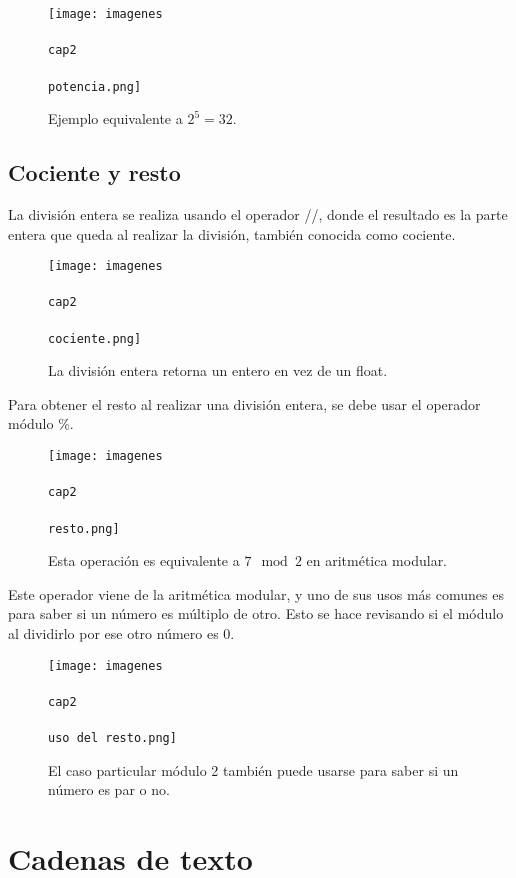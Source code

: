 \documentclass{article}
\begin{document}
      \begin{figure}[ht!]
        \texttt{[image: imagenes\\\\cap2\\\\potencia.png]}
        \caption{Ejemplo equivalente a $2 ^ 5 = 32$.}
      \end{figure}

      \subsection{Cociente y resto}

      La división entera se realiza usando el operador //, donde el resultado es la parte entera que queda al realizar la división, también conocida como cociente.
      
      \begin{figure}[ht!]
        \texttt{[image: imagenes\\\\cap2\\\\cociente.png]}
        \caption{La división entera retorna un entero en vez de un float.}
      \end{figure}

      Para obtener el resto al realizar una división entera, se debe usar el operador módulo \%.

      \begin{figure}[ht!]
        \texttt{[image: imagenes\\\\cap2\\\\resto.png]}
        \caption{Esta operación es equivalente a $7 \mod{2}$ en aritmética modular.}
      \end{figure}

      Este operador viene de la aritmética modular, y uno de sus usos más comunes es para saber si un número es múltiplo de otro. Esto se hace revisando si el módulo al dividirlo por ese otro número es 0.

      \begin{figure}[ht!]
        \texttt{[image: imagenes\\\\cap2\\\\uso del resto.png]}
        \caption{El caso particular módulo 2 también puede usarse para saber si un número es par o no.}
      \end{figure}

    \section{Cadenas de texto}
\end{document}

